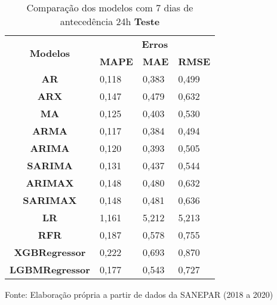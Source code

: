 \begin{table}[H]
	\centering
	\caption{Comparação dos modelos com 7 dias de antecedência 24h \textbf{Teste} }\label{tb:10-24tst}
	\begin{tabular}{@{}clll@{}}
		\toprule
		\multirow{2}{*}{\textbf{Modelos}} & \multicolumn{3}{c}{\textbf{Erros}}                                                                       \\ \cmidrule(l){2-4} 
		& \multicolumn{1}{c}{\textbf{MAPE}} & \multicolumn{1}{c}{\textbf{MAE}} & \multicolumn{1}{c}{\textbf{RMSE}} \\ \hline
\textbf{AR}                       & 0,118                             & 0,383                            & 0,499                             \\
\textbf{ARX}                      & 0,147                             & 0,479                            & 0,632                             \\
\textbf{MA}                       & 0,125                             & 0,403                            & 0,530                             \\
\textbf{ARMA}                     & 0,117                             & 0,384                            & 0,494                             \\
\textbf{ARIMA}                    & 0,120                             & 0,393                            & 0,505                             \\
\textbf{SARIMA}                   & 0,131                             & 0,437                            & 0,544                             \\
\textbf{ARIMAX}                   & 0,148                             & 0,480                            & 0,632                             \\
\textbf{SARIMAX}                  & 0,148                             & 0,481                            & 0,636                             \\
\textbf{LR}                       & 1,161                             & 5,212                            & 5,213                             \\
\textbf{RFR}                      & 0,187                             & 0,578                            & 0,755                             \\
\textbf{XGBRegressor}             & 0,222                             & 0,693                            & 0,870                             \\
\textbf{LGBMRegressor}            & 0,177                             & 0,543                            & 0,727                             \\ \bottomrule
	\end{tabular}

Fonte: Elaboração própria a partir de dados da SANEPAR (2018 a 2020)
\end{table}

